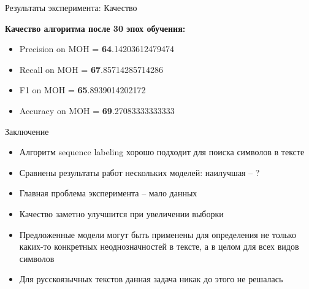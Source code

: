 \documentclass{beamer}
\begin{document}
		\begin{frame}{Результаты эксперимента: Качество}
			\begin{center}
					\textbf{	Качество алгоритма после 30 эпох обучения:}
		\begin{itemize}
			\item Precision on MOH =  \textbf{64}.14203612479474
			\item Recall on MOH =  \textbf{67}.85714285714286
			\item F1 on MOH =  \textbf{65}.8939014202172
			\item Accuracy on MOH =  \textbf{69}.27083333333333
		\end{itemize}
			\end{center}
		\end{frame}
	\begin{frame}{Заключение}
		\begin{itemize}
			\item Алгоритм sequence labeling хорошо подходит для поиска символов в тексте
			\item Сравнены результаты работ нескольких моделей: наилучшая – ?
			\item Главная проблема эксперимента -- мало данных
			\item Качество заметно улучшится при увеличении выборки
			\item Предложенные модели могут быть применены для определения не только каких-то конкретных неоднозначностей в тексте, а в целом для всех видов символов
			\item Для русскоязычных текстов данная задача никак до этого не решалась
		\end{itemize}
	\end{frame}
\end{document}
